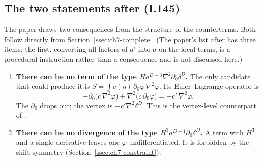\subsection{The two statements after (I.145)}
\tD{}
The paper draws two consequences from the structure of the counterterms. Both follow directly from Section~\ref{ssec:ch7-complete}.
(The paper's list after  has three items; the first, converting all factors of $a'$ into $a$ on the local terms, is a procedural instruction rather than a consequence and is not discussed here.)
\begin{enumerate}[leftmargin=18pt]
\item \textbf{There can be no term of the type $Ha^{D-3}\nabla^2\partial_0\delta^D$.}
The only candidate that could produce it is $S=\int c(\eta)\,\partial_0\varphi\,\nabla^2\varphi$. Its Euler--Lagrange operator is
\begin{equation*}
-\partial_0\big(c\,\nabla^2\varphi\big)+\nabla^2\big(c\,\partial_0\varphi\big)=-c'\,\nabla^2\varphi .
\end{equation*}
The $\partial_0$ drops out; the vertex is $-c'\nabla^2\delta^D$. This is the vertex-level counterpart of .
\item \textbf{There can be no divergence of the type $H^3a^{D-1}\partial_0\delta^D$.}
A term with $H^3$ and a single derivative leaves one $\varphi$ undifferentiated. It is forbidden by the shift symmetry (Section~\ref{ssec:ch7-constraint}).
\end{enumerate}

